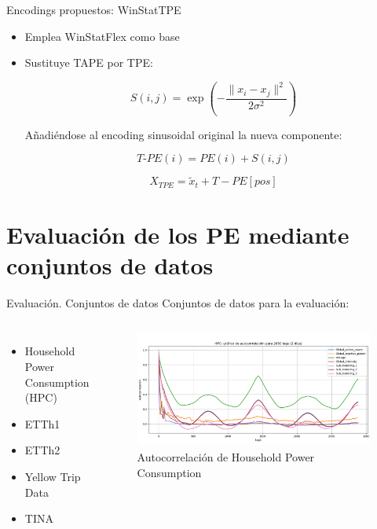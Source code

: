 \documentclass[compress]{beamer}
\begin{document}
	\begin{frame}{Encodings propuestos: WinStatTPE}
	\begin{itemize}
		\item Emplea WinStatFlex como base
		\item Sustituye TAPE por TPE:
		
		$$S(i, j) = \exp\left( -\frac{\|x_i - x_j\|^2}{2\sigma^2} \right)$$
		
		Añadiéndose al encoding sinusoidal original la nueva componente:
		
		$$T\text{-}PE(i) = PE(i) + S(i, j)$$
		
		$$
		X_{TPE} = \tilde{x}_t + T-PE[pos]
		$$
		
		
	 \end{itemize}
	\end{frame}
	
	\section{Evaluación de los PE mediante conjuntos de datos}
	
	\begin{frame}{Evaluación. Conjuntos de datos}
		Conjuntos de datos para la evaluación:
		
		\begin{columns}
			
			\begin{itemize}
				\item Household Power Consumption (HPC)
				\item ETTh1
				\item ETTh2
				\item Yellow Trip Data
				\item TINA
			\end{itemize}
		
			\centering
			\begin{figure}
				\includegraphics[width=\linewidth]{pic/auto.png}
				\caption{Autocorrelación de Household Power Consumption}
			\end{figure}
		
		\end{columns} 
				
	\end{frame}	
\end{document}
